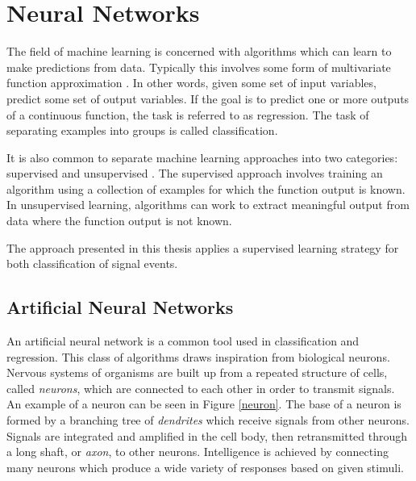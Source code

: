 \chapter{Neural Networks}
\label{nnet_chapter}

The field of machine learning is concerned with algorithms which can learn to make predictions from data.  Typically this involves some form of multivariate function approximation \cite{reed1999neural}.
In other words, given some set of input variables, predict some set of output variables.  If the goal is to predict one or more outputs of a continuous function, the task is referred to as regression.  The task of separating examples into groups is called classification.

It is also common to separate machine learning approaches into two categories: supervised and unsupervised \cite{lecun2015deep}.
The supervised approach involves training an algorithm using a collection of examples for which the function output is known.  In unsupervised learning, algorithms can work to extract meaningful output from data where the function output is not known.

The approach presented in this thesis applies a supervised learning strategy for both classification of signal events.



\section{Artificial Neural Networks}

An artificial neural network is a common tool used in classification and regression.  This class of algorithms draws inspiration from biological neurons.  Nervous systems of organisms are built up from a repeated structure of cells, called \textit{neurons}, which are connected to each other in order to transmit signals.  An example of a neuron can be seen in Figure \ref{neuron}.  The base of a neuron is formed by a branching tree of \textit{dendrites} which receive signals from other neurons.  Signals are integrated and amplified in the cell body, then retransmitted through a long shaft, or \textit{axon}, to other neurons.  Intelligence is achieved by connecting many neurons which produce a wide variety of responses based on given stimuli.


